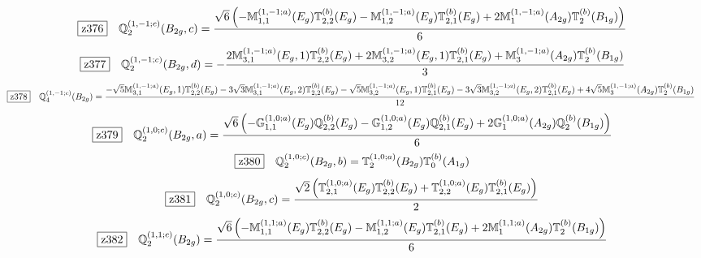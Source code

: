 \documentclass[fleqn,10pt,landscape]{jsarticle}
\begin{document}
\begin{dmath*}
\hspace*{3mm}\fbox{z376}\quad \mathbb{Q}_{2}^{(1,-1;c)}(B_{2g},c)=\frac{\sqrt{6} \left(- \mathbb{M}_{1,1}^{(1,-1;a)}(E_{g}) \mathbb{T}_{2,2}^{(b)}(E_{g}) - \mathbb{M}_{1,2}^{(1,-1;a)}(E_{g}) \mathbb{T}_{2,1}^{(b)}(E_{g}) + 2 \mathbb{M}_{1}^{(1,-1;a)}(A_{2g}) \mathbb{T}_{2}^{(b)}(B_{1g})\right)}{6}
\end{dmath*}
\begin{dmath*}
\hspace*{3mm}\fbox{z377}\quad \mathbb{Q}_{2}^{(1,-1;c)}(B_{2g},d)=- \frac{2 \mathbb{M}_{3,1}^{(1,-1;a)}(E_{g},1) \mathbb{T}_{2,2}^{(b)}(E_{g}) + 2 \mathbb{M}_{3,2}^{(1,-1;a)}(E_{g},1) \mathbb{T}_{2,1}^{(b)}(E_{g}) + \mathbb{M}_{3}^{(1,-1;a)}(A_{2g}) \mathbb{T}_{2}^{(b)}(B_{1g})}{3}
\end{dmath*}
\begin{dmath*}
\hspace*{3mm}\fbox{z378}\quad \mathbb{Q}_{4}^{(1,-1;c)}(B_{2g})=\frac{- \sqrt{5} \mathbb{M}_{3,1}^{(1,-1;a)}(E_{g},1) \mathbb{T}_{2,2}^{(b)}(E_{g}) - 3 \sqrt{3} \mathbb{M}_{3,1}^{(1,-1;a)}(E_{g},2) \mathbb{T}_{2,2}^{(b)}(E_{g}) - \sqrt{5} \mathbb{M}_{3,2}^{(1,-1;a)}(E_{g},1) \mathbb{T}_{2,1}^{(b)}(E_{g}) - 3 \sqrt{3} \mathbb{M}_{3,2}^{(1,-1;a)}(E_{g},2) \mathbb{T}_{2,1}^{(b)}(E_{g}) + 4 \sqrt{5} \mathbb{M}_{3}^{(1,-1;a)}(A_{2g}) \mathbb{T}_{2}^{(b)}(B_{1g})}{12}
\end{dmath*}
\begin{dmath*}
\hspace*{3mm}\fbox{z379}\quad \mathbb{Q}_{2}^{(1,0;c)}(B_{2g},a)=\frac{\sqrt{6} \left(- \mathbb{G}_{1,1}^{(1,0;a)}(E_{g}) \mathbb{Q}_{2,2}^{(b)}(E_{g}) - \mathbb{G}_{1,2}^{(1,0;a)}(E_{g}) \mathbb{Q}_{2,1}^{(b)}(E_{g}) + 2 \mathbb{G}_{1}^{(1,0;a)}(A_{2g}) \mathbb{Q}_{2}^{(b)}(B_{1g})\right)}{6}
\end{dmath*}
\begin{dmath*}
\hspace*{3mm}\fbox{z380}\quad \mathbb{Q}_{2}^{(1,0;c)}(B_{2g},b)=\mathbb{T}_{2}^{(1,0;a)}(B_{2g}) \mathbb{T}_{0}^{(b)}(A_{1g})
\end{dmath*}
\begin{dmath*}
\hspace*{3mm}\fbox{z381}\quad \mathbb{Q}_{2}^{(1,0;c)}(B_{2g},c)=\frac{\sqrt{2} \left(\mathbb{T}_{2,1}^{(1,0;a)}(E_{g}) \mathbb{T}_{2,2}^{(b)}(E_{g}) + \mathbb{T}_{2,2}^{(1,0;a)}(E_{g}) \mathbb{T}_{2,1}^{(b)}(E_{g})\right)}{2}
\end{dmath*}
\begin{dmath*}
\hspace*{3mm}\fbox{z382}\quad \mathbb{Q}_{2}^{(1,1;c)}(B_{2g})=\frac{\sqrt{6} \left(- \mathbb{M}_{1,1}^{(1,1;a)}(E_{g}) \mathbb{T}_{2,2}^{(b)}(E_{g}) - \mathbb{M}_{1,2}^{(1,1;a)}(E_{g}) \mathbb{T}_{2,1}^{(b)}(E_{g}) + 2 \mathbb{M}_{1}^{(1,1;a)}(A_{2g}) \mathbb{T}_{2}^{(b)}(B_{1g})\right)}{6}
\end{dmath*}
\end{document}

